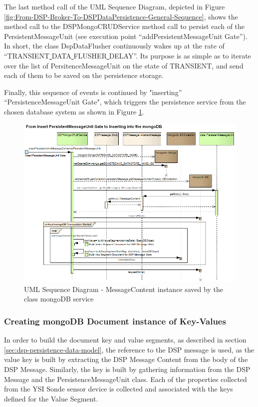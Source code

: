 The last method call of the UML Sequence Diagram, depicted in Figure
\ref{fig:From-DSP-Broker-To-DSPDataPersistence-General-Sequence}, shows the
method call to the DSPMongoCRUDService method call to persist each of the
PersistentMessageUnit (see execution point ``addPersistentMessageUnit Gate'').
In short, the class DspDataFlusher continuously wakes up at the rate of
``TRANSIENT\underline{ }DATA\underline{ }FLUSHER\underline{ }DELAY''. Its
purpose is as simple as to iterate over the list of PersitenceMessageUnit on
the state of TRANSIENT, and send each of them to be saved on the persistence
storage. 

Finally, this sequence of events is continued by "inserting''
``PersistenceMessageUnit Gate", which triggers the persistence service from the
chosen database system as shown in Figure
\ref{fig:From-Insert-PersistentMessageUnit-to-mongoDB}.

\begin{figure}[!h]
  \centering
  \includegraphics[scale=0.6]{../diagrams/From-Insert-PersistentMessageUnit-to-mongoDB} 
  \caption{UML Sequence Diagram - MessageContent instance saved by the class
  mongoDB service}
  \label{fig:From-Insert-PersistentMessageUnit-to-mongoDB}
\end{figure}

\subsubsection{Creating mongoDB Document instance of Key-Values}

In order to build the document key and value segments, as described in
section \ref{sec:dsp-persistence-data-model}, the reference to the DSP message
is used, as the value key is built by extracting the DSP Message Content from
the body of the DSP Message. Similarly, the key is built by gathering
information from the DSP Message and the PersistenceMessageUnit class. Each of
the properties collected from the YSI Sonde sensor device is collected and
associated with the keys defined for the Value Segment.


